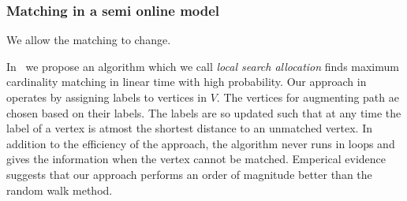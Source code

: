 \documentclass{scrartcl}
\begin{document}


\subsubsection{Matching in a semi online model}
We allow the matching to change.

In~\cite{ballsbins} we propose an algorithm which we call \emph{local search allocation} finds maximum cardinality matching in linear time with high probability.
Our approach in~\cite{ballsbins} operates by assigning labels to vertices in $V$. The vertices for augmenting path ae chosen based on their labels. The labels are so updated such that at any time the label of a vertex is atmost the shortest distance to an unmatched vertex. In addition to the efficiency of the approach, the algorithm never runs in loops and gives the information when the vertex cannot be matched. Emperical evidence suggests that our approach performs an order of magnitude better than the random walk method.
\end{document}
